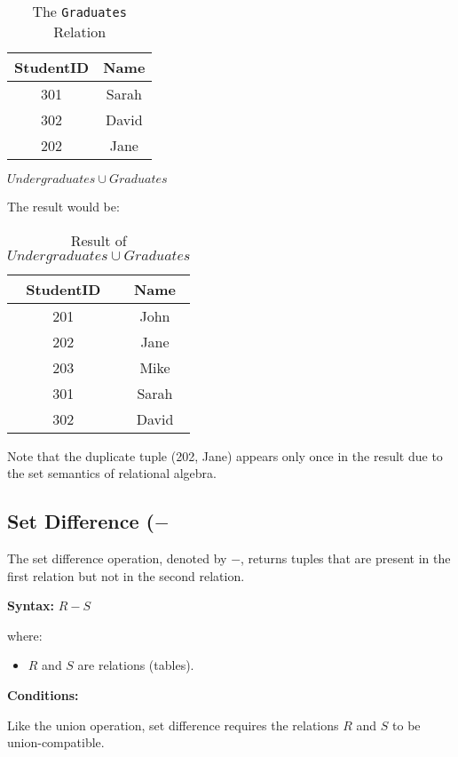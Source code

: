 \documentclass[12pt]{book}
\begin{document}
\begin{table}[htbp]
\centering
\begin{tabular}{@{}cc@{}}
\toprule
StudentID & Name \\
\midrule
301 & Sarah \\
302 & David \\
202 & Jane \\ %
\bottomrule
\end{tabular}
\caption{The \texttt{Graduates} Relation}
\label{tab:graduates}
\end{table}

$\mathit{Undergraduates} \cup \mathit{Graduates}$

The result would be:

\begin{table}[htbp]
\centering
\begin{tabular}{@{}cc@{}}
\toprule
StudentID & Name \\
\midrule
201 & John \\
202 & Jane \\ %
203 & Mike \\
301 & Sarah \\
302 & David \\
\bottomrule
\end{tabular}
\caption{Result of $\mathit{Undergraduates} \cup \mathit{Graduates}$}
\label{tab:union_result}
\end{table}

Note that the duplicate tuple (202, Jane) appears only once in the result due to the set semantics of relational algebra.

\subsection{Set Difference ($-$}

The set difference operation, denoted by $-$, returns tuples that are present in the first relation but not in the second relation.

\textbf{Syntax:} $\mathit{R} - \mathit{S}$

where:
\begin{itemize}
    \item $\mathit{R}$ and $\mathit{S}$ are relations (tables).
\end{itemize}

\textbf{Conditions:}

Like the union operation, set difference requires the relations $\mathit{R}$ and $\mathit{S}$ to be union-compatible.
\end{document}
